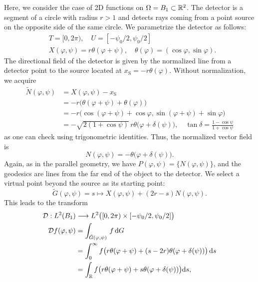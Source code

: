 \documentclass{amsart}
\renewcommand*{\phi}{\varphi}
\begin{document}
\begin{example}
 Here, we consider the case of 2D functions on $\Omega = B_1 \subset {\ensuremath{\mathbb{R}}}^2$. The detector is a segment of a circle with radius $r > 1$ and 
 detects rays coming from a point source on the opposite side of the same circle. We parametrize the detector as follows:
 \begin{align*}
  & T = [0, 2\pi),\quad U = [-\psi_0/2, \psi_0/2] \\
  & X(\phi, \psi) = r \theta(\phi + \psi), \quad \theta(\phi) = (\cos\phi, \sin\phi).
 \end{align*}
 The directional field of the detector is given by the normalized line from a detector point to the source located at 
 $x_{\mathrm{S}} = -r \theta(\phi)$. Without normalization, we acquire
 \begin{align*}
  \tilde N(\phi, \psi) 
  &= X(\phi, \psi) - x_{\mathrm{S}} \\
  &= - r \big(\theta(\phi + \psi) + \theta(\phi)\big) \\
  &= - r \big(\cos(\phi + \psi) + \cos\phi, \sin(\phi + \psi) + \sin\phi \big)\\
  &= - \sqrt{2(1 + \cos\psi)}\, r \theta\big(\phi + \delta(\psi)\big), \quad \tan\delta = \frac{1 - \cos\psi}{1 + \cos\psi}
 \end{align*}
 as one can check using trigonometric identities. Thus, the normalized vector field is
 \begin{equation}
  N(\phi, \psi) = - \theta\big(\phi + \delta(\psi)\big).
 \end{equation} 
 Again, as in the parallel geometry, we have $P(\phi,\psi) = \lbrace N(\phi,\psi)\rbrace$, and the geodesics are lines from the far end of 
 the object to the detector. We select a virtual point beyond the source as its starting point:
 \begin{equation*}
  \tilde G(\phi, \psi) = s \mapsto X(\phi,\psi) + (2r-s) N(\phi,\psi).
 \end{equation*}
 This leads to the transform
 \begin{align*}
  \OPD: L^2(B_1) &\Lto L^2\big([0,2\pi) \times [-\psi_0/2, \psi_0/2]\big)\\
  \OPD f(\phi, \psi) 
  &= \int_{\tilde G(\phi,\psi)}\, f \, \D G\\
  &= \int_0^\infty f\big(r\theta(\phi + \psi) + (s-2r)\theta(\phi + \delta(\psi))\big)\, \D s \\
  &= \int_\RR f\big(r\theta(\phi + \psi) + s\theta(\phi + \delta(\psi))\big) \D s,

\end{align*}
\end{example}
\end{document}
